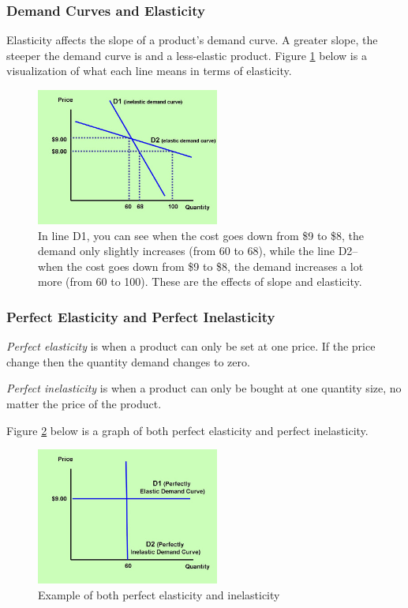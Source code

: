 \documentclass[a4paper, 12pt] {article}
\begin{document}
\subsubsection{Demand Curves and Elasticity}
Elasticity affects the slope of a product's demand curve. A greater slope, the
steeper the demand curve is and a less-elastic product. Figure \ref{fig:dem_cur_ela}
below is a visualization of what each line means in terms of elasticity.
\begin{figure}[h]
    \centering
    \includegraphics[height=4.5cm, width=6cm]{demand_curve_elasticity.jpg}
    \caption{In line D1, you can see when the cost goes down from \$9 to \$8,
    the demand only slightly increases (from 60 to 68), while the line D2--when
    the cost goes down from \$9 to \$8, the demand increases a lot more (from
    60 to 100). These are the effects of slope and elasticity.}
    \label{fig:dem_cur_ela}
\end{figure}

\subsubsection{Perfect Elasticity and Perfect Inelasticity}
\emph{Perfect elasticity} is when a product can only be set at one price. If the price
change then the quantity demand changes to zero.

\emph{Perfect inelasticity} is when a product can only be bought at one quantity
size, no matter the price of the product.

Figure \ref{fig:perf_elast} below is a graph of both perfect elasticity and
perfect inelasticity.
\begin{figure}[ht]
    \centering
    \includegraphics[height=4.5cm, width=6cm]{perfect_elasticity.jpg}
    \caption{Example of both perfect elasticity and inelasticity}
    \label{fig:perf_elast}
\end{figure}
\end{document}
